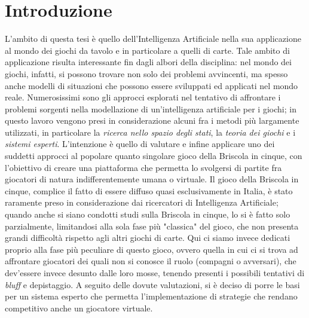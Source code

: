 \chapter*{Introduzione}

\ifpdf
    \graphicspath{{Introduction/IntroductionFigs/PNG/}{Introduction/IntroductionFigs/PDF/}{Introduction/IntroductionFigs/}}
\else
    \graphicspath{{Introduction/IntroductionFigs/EPS/}{Introduction/IntroductionFigs/}}
\fi

L'ambito di questa tesi è quello dell'Intelligenza Artificiale nella sua applicazione al mondo dei giochi da tavolo e in particolare a quelli di carte. Tale ambito di applicazione risulta interessante fin dagli albori della disciplina: nel mondo dei giochi, infatti, si possono trovare non solo dei problemi avvincenti, ma spesso anche modelli di situazioni che possono essere sviluppati ed applicati nel mondo reale.
Numerosissimi sono gli approcci esplorati nel tentativo di affrontare i problemi sorgenti nella modellazione di un'intelligenza artificiale per i giochi; in questo lavoro vengono presi in considerazione alcuni fra i metodi più largamente utilizzati, in particolare la \emph{ricerca nello spazio degli stati}, la \emph{teoria dei giochi} e i \emph{sistemi esperti}.
L'intenzione è quello di valutare e infine applicare uno dei suddetti approcci al popolare quanto singolare gioco della Briscola in cinque, con l'obiettivo di creare una piattaforma che permetta lo svolgersi di partite fra giocatori di natura indifferentemente umana o virtuale.
Il gioco della Briscola in cinque, complice il fatto di essere diffuso quasi esclusivamente in Italia, è stato raramente preso in considerazione dai ricercatori di Intelligenza Artificiale; quando anche si siano condotti studi sulla Briscola in cinque, lo si è fatto solo parzialmente, limitandosi alla sola fase più "classica" del gioco, che non presenta grandi difficoltà rispetto agli altri giochi di carte.
Qui ci siamo invece dedicati proprio alla fase più peculiare di questo gioco, ovvero quella in cui ci si trova ad affrontare giocatori dei quali non si conosce il ruolo (compagni o avversari), che dev'essere invece desunto dalle loro mosse, tenendo presenti i possibili tentativi di \emph{bluff} e depistaggio.
A seguito delle dovute valutazioni, si è deciso di porre le basi per un sistema esperto che permetta l'implementazione di strategie che rendano competitivo anche un giocatore virtuale.



